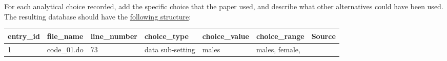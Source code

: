 \documentclass[]{book}
\begin{document}
For each analytical choice recorded, add the specific choice that the paper used, and describe what other alternatives could have been used. The resulting database should have the \href{https://docs.google.com/spreadsheets/d/1nZuJSHswbZgaaIfBcyIUGPwG-WIP8zE1Oambud-WoDc/edit?usp=sharing}{following structure}:

\begin{longtable}[]{@{}lllllll@{}}
\toprule
\begin{minipage}[b]{0.05\columnwidth}\raggedright
entry\_id\strut
\end{minipage} & \begin{minipage}[b]{0.07\columnwidth}\raggedright
file\_name\strut
\end{minipage} & \begin{minipage}[b]{0.08\columnwidth}\raggedright
line\_number\strut
\end{minipage} & \begin{minipage}[b]{0.12\columnwidth}\raggedright
choice\_type\strut
\end{minipage} & \begin{minipage}[b]{0.19\columnwidth}\raggedright
choice\_value\strut
\end{minipage} & \begin{minipage}[b]{0.18\columnwidth}\raggedright
choice\_range\strut
\end{minipage} & \begin{minipage}[b]{0.12\columnwidth}\raggedright
Source\strut
\end{minipage}\tabularnewline
\midrule
\endhead
\begin{minipage}[t]{0.05\columnwidth}\raggedright
1\strut
\end{minipage} & \begin{minipage}[t]{0.07\columnwidth}\raggedright
code\_01.do\strut
\end{minipage} & \begin{minipage}[t]{0.08\columnwidth}\raggedright
73\strut
\end{minipage} & \begin{minipage}[t]{0.12\columnwidth}\raggedright
data sub-setting\strut
\end{minipage} & \begin{minipage}[t]{0.19\columnwidth}\raggedright
males\strut
\end{minipage} & \begin{minipage}[t]{0.18\columnwidth}\raggedright
males, female,\strut
\end{minipage} & \begin{minipage}[t]{0.12\columnwidth}\raggedright

\end{minipage}
\end{longtable}
\end{document}
